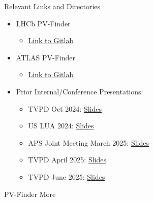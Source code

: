 \documentclass[xcolor=table,aspectratio=169]{beamer}
\begin{document}
\begin{frame}{Relevant Links and Directories}
    \begin{itemize}
        \item LHCb PV-Finder
        \begin{itemize}
            \item \href{https://gitlab.cern.ch/sakar/pv-finder_v2/-/tree/master}{Link to Gitlab}
        \end{itemize}
        \item ATLAS PV-Finder
        \begin{itemize}
            \item \href{https://gitlab.cern.ch/qlei/atlas_pvfinder}{Link to Gitlab}
        \end{itemize}
        \item Prior Internal/Conference Presentations:
        \begin{itemize}
            \item TVPD Oct 2024: \href{https://drive.google.com/file/d/17qCnL57fT7LCKyQ1Rz-soJySaNCVeMRV/view?usp=sharing}{Slides}
            \item US LUA 2024: \href{https://drive.google.com/file/d/1HbAjlKBw6nej-oqOksUL_HOfKY8xsd2r/view?usp=sharing}{Slides}
            \item APS Joint Meeting March 2025: \href{https://drive.google.com/file/d/1j6pnqzuXcP0OWXoUXkwElH8lAbv9GtRq/view?usp=drive_link}{Slides}
            \item TVPD April 2025: \href{https://indico.cern.ch/event/1534661/}{Slides}
            \item TVPD June 2025: \href{https://indico.cern.ch/event/1557481/}{Slides}
        \end{itemize}
    \end{itemize}
\end{frame}

\begin{frame}[plain]
    \centering
    PV-Finder More
\end{frame}
\end{document}
